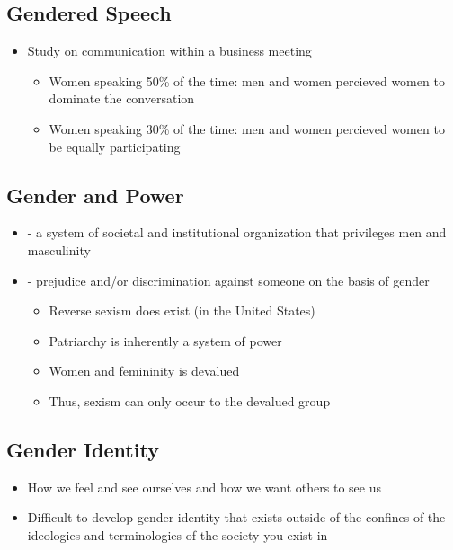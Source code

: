 \documentclass{article}
\begin{document}
\subsection{Gendered Speech}
\begin{itemize}
  \item Study on communication within a business meeting \begin{itemize}
    \item Women speaking 50\% of the time:  men and women percieved women to dominate the conversation
    \item Women speaking 30\% of the time:  men and women percieved women to be equally participating
  \end{itemize}
\end{itemize}

\subsection{Gender and Power}
\begin{itemize}
  \item {} - a system of societal and institutional organization that privileges men and masculinity
  \item {} - prejudice and/or discrimination against someone on the basis of gender \begin{itemize}
    \item Reverse sexism does  exist (in the United States)
    \item Patriarchy is inherently a system of power
    \item Women and femininity is devalued
    \item Thus, sexism can only occur to the devalued group
  \end{itemize}
\end{itemize}

\subsection{Gender Identity}
\begin{itemize}
  \item How we feel and see ourselves and how we want others to see us
  \item Difficult to develop gender identity that exists outside of the confines of the ideologies and terminologies of the society you exist in
\end{itemize}
\end{document}

